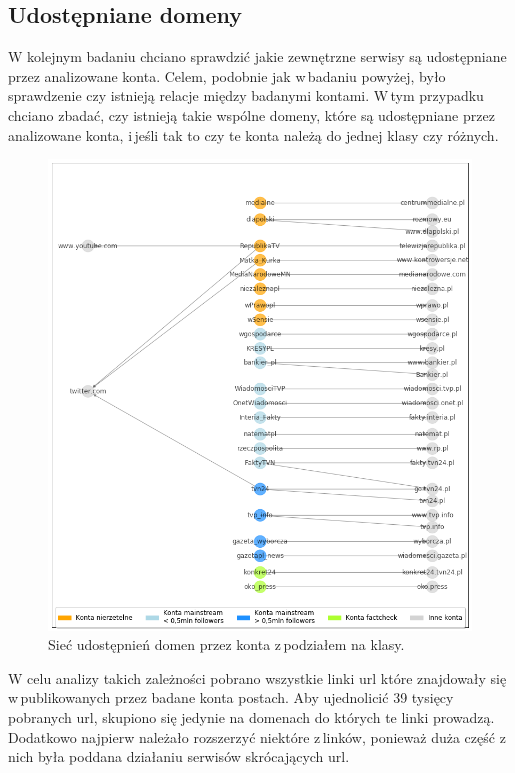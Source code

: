 \subsection{Udostępniane domeny}
W kolejnym badaniu chciano sprawdzić jakie zewnętrzne serwisy są udostępniane przez analizowane konta. Celem, podobnie jak w\,badaniu powyżej, było sprawdzenie czy istnieją relacje między badanymi kontami. W\,tym przypadku chciano zbadać, czy istnieją takie wspólne domeny, które są udostępniane przez analizowane konta, i\,jeśli tak to czy te konta należą do jednej klasy czy różnych.
\begin{figure}[!h]
	\centering \includegraphics[width=1.0\linewidth]{img/results/connectionwithlikns.png}
	\caption{Sieć udostępnień domen przez konta z\,podziałem na klasy.} \label{fig:connectedlinks}
\end{figure}
\par



\newpage
W celu analizy takich zależności pobrano wszystkie linki url które znajdowały się w\,publikowanych przez badane konta postach. Aby ujednolicić 39 tysięcy pobranych url, skupiono się jedynie na domenach do których te linki prowadzą. Dodatkowo najpierw należało rozszerzyć niektóre z\,linków, ponieważ duża część z\,nich była poddana działaniu serwisów skrócających url. 


